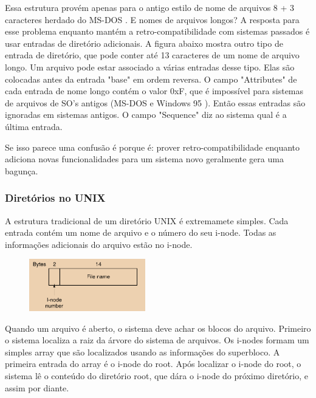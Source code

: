 \documentclass{article}
\newcommand\unix{{\color{red}UNIX} }
\newcommand\msdos{{\color{yellow}MS-DOS} }
\newcommand\winnovecinco{{\color{green}Windows 95} }
\begin{document}
Essa estrutura provém apenas para o antigo estilo de nome de arquivos 8 + 3 caracteres herdado do \msdos. E nomes de arquivos longos? A resposta para esse problema enquanto mantém a retro-compatibilidade com sistemas passados é usar entradas de diretório adicionais. A figura abaixo mostra outro tipo de entrada de diretório, que pode conter até 13 caracteres de um nome de arquivo longo. Um arquivo pode estar associado a várias entradas desse tipo. Elas são colocadas antes da entrada "base" em ordem reversa. O campo "Attributes" de cada entrada de nome longo contém o valor 0xF, que é impossível para sistemas de arquivos de SO's antigos (\msdos e \winnovecinco). Então essas entradas são ignoradas em sistemas antigos. O campo "Sequence" diz ao sistema qual é a última entrada. 

Se isso parece uma confusão é porque é: prover retro-compatibilidade enquanto adiciona novas funcionalidades para um sistema novo geralmente gera uma bagunça.

\subsubsection{Diretórios no \unix}

A estrutura tradicional de um diretório \unix é extremamete simples. Cada entrada contém um nome de arquivo e o número do seu i-node. Todas as informações adicionais do arquivo estão no i-node. 

\begin{figure}[h]
  \begin{center}
    \includegraphics[width=0.45\textwidth]{img/5-15.png}
  \end{center}
  \caption{}
  \label{fig:}
\end{figure}

Quando um arquivo é aberto, o sistema deve achar os blocos do arquivo. Primeiro o sistema localiza a raiz da árvore do sistema de arquivos. Os i-nodes formam um simples array que são localizados usando as informações do superbloco. A primeira entrada do array é o i-node do root. Após localizar o i-node do root, o sistema lê o conteúdo do diretório root, que dára o i-node do próximo diretório, e assim por diante. 
\end{document}
